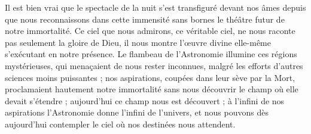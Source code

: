 \documentclass[a4paper, 11pt, oneside, landscape]{article}
\begin{document}
Il est bien vrai que le spectacle de la nuit s'est transfiguré devant nos âmes depuis que nous reconnaissons dans cette immensité sans bornes le théâtre futur de notre immortalité. Ce ciel que nous admirons, ce véritable ciel, ne nous raconte pas seulement la gloire de Dieu, il nous montre l'œuvre divine elle-même s'exécutant en notre présence. Le flambeau de l'Astronomie illumine ces régions mystérieuses, qui menaçaient de nous rester inconnues, malgré les efforts d'autres sciences moins puissantes ; nos aspirations, coupées dans leur sève par la Mort, proclamaient hautement notre immortalité sans nous découvrir le champ où elle devait s'étendre ; aujourd'hui ce champ nous est découvert ; à l'infini de nos aspirations l'Astronomie donne l'infini de l'univers, et nous pouvons dès aujourd'hui contempler le ciel où nos destinées nous attendent.
\end{document}
